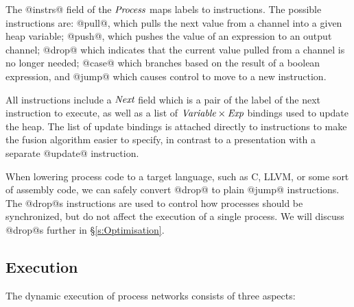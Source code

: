 The @instrs@ field of the $\textit{Process}$ maps labels to instructions. The possible instructions are: @pull@, which pulls the next value from a channel into a given heap variable; @push@, which pushes the value of an expression to an output channel;  @drop@ which indicates that the current value pulled from a channel is no longer needed; @case@ which branches based on the result of a boolean expression, and @jump@ which causes control to move to a new instruction.

All instructions include a $\textit{Next}$ field which is a pair of the label of the next instruction to execute, as well as a list of $\textit{Variable} \times \textit{Exp}$ bindings used to update the heap. The list of update bindings is attached directly to instructions to make the fusion algorithm easier to specify, in contrast to a presentation with a separate @update@ instruction. 

\eject{}
When lowering process code to a target language, such as C, LLVM, or some sort of assembly code, we can safely convert @drop@ to plain @jump@ instructions. The @drop@s instructions are used to control how processes should be synchronized, but do not affect the execution of a single process. We will discuss @drop@s further in \S\ref{s:Optimisation}.




\subsection{Execution}
\label{s:Process:Eval}

The dynamic execution of process networks consists of three aspects:

